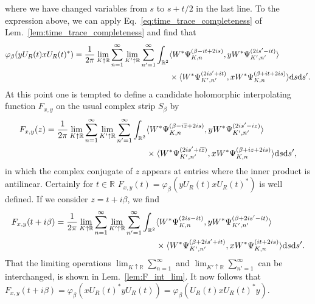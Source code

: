 \documentclass[sn-mathphys-num]{sn-jnl}%
\newcommand{\RR}{\mathbb{R}}
\newcommand{\diff}{\textup{d}}
\numberwithin{equation}{section}
\theoremstyle{thmstyleone}%
\theoremstyle{thmstyletwo}%
\theoremstyle{thmstylethree}%
\begin{document}
where we have changed variables from $s$ to $s+t/2$ in the last line. To the expression above, we can apply Eq.\ \eqref{eq:time_trace_completeness} of Lem.\ \ref{lem:time_trace_completeness} and find that
\begin{align}
    \varphi_\beta(yU_R(t)xU_R(t)^*)=\frac{1}{2\pi}\lim_{K\uparrow\RR}\sum_{n=1}^\infty \lim_{K'\uparrow\RR}\sum_{n'=1}^\infty\int_{\RR^2}& \langle W^*\Psi_{K,n}^{(\beta-it+2is)},yW^*\Psi_{K',n'}^{(2is'-it)}\rangle\nonumber\\
    &\times\langle W^*\Psi_{K',n'}^{(2is'+it)},xW^*\Psi_{K,n}^{(\beta+it+2is)}\rangle\diff s\diff s'.
\end{align}
At this point one is tempted to define a candidate holomorphic interpolating function $F_{x,y}$ on the usual complex strip $S_\beta$ by
\begin{align}
    F_{x,y}(z)=\frac{1}{2\pi}\lim_{K\uparrow\RR}\sum_{n=1}^\infty \lim_{K'\uparrow\RR}\sum_{n'=1}^\infty\int_{\RR^2}& \langle W^*\Psi_{K,n}^{(\beta-i\overline{z}+2is)},yW^*\Psi_{K',n'}^{(2is'-iz)}\rangle\nonumber\\
    &\times\langle W^*\Psi_{K',n'}^{(2is'+i\overline{z})},xW^*\Psi_{K,n}^{(\beta+iz+2is)}\rangle\diff s\diff s',
\end{align}
in which  the complex conjugate of $z$ appears at entries where the inner product is antilinear. Certainly for $t\in \RR$ $F_{x,y}(t)=\varphi_\beta(yU_R(t)xU_R(t)^*)$ is well defined. If we consider $z=t+i\beta$, we find
\begin{align}
    F_{x,y}(t+i\beta)=\frac{1}{2\pi}\lim_{K\uparrow\RR}\sum_{n=1}^\infty \lim_{K'\uparrow\RR}\sum_{n'=1}^\infty\int_{\RR^2}& \langle W^*\Psi_{K,n}^{(2is-it)},yW^*\Psi_{K',n'}^{(\beta+2is'-it)}\rangle\nonumber\\
    &\times\langle W^*\Psi_{K',n'}^{(\beta+2is'+it)},xW^*\Psi_{K,n}^{(it+2is)}\rangle\diff s\diff s'.
\end{align}
That the limiting operations $\lim_{K\uparrow\RR}\sum_{n=1}^\infty$ and $\lim_{K'\uparrow\RR}\sum_{n'=1}^\infty$ can be interchanged, is shown in Lem.\ \ref{lem:F_int_lim}. It now follows that $F_{x,y}(t+i\beta)=\varphi_\beta(x U_R(t)^*yU_R(t))=\varphi_\beta(U_R(t)x U_R(t)^*y)$.
\end{document}
